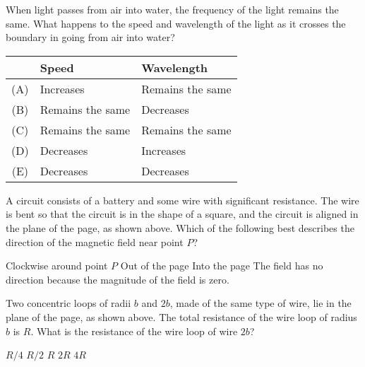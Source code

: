 \documentclass[12pt]{exam}
\begin{document}
\begin{questions}
  \question When light passes from air into water, the frequency of the light
  remains the same. What happens to the speed and wavelength of the light as
  it crosses the boundary in going from air into water?

  \begin{tabular}{cll}
    & Speed & Wavelength \\\hline
    (A) & Increases        & Remains the same \\
    (B) & Remains the same & Decreases        \\
    (C) & Remains the same & Remains the same \\
    (D) & Decreases        & Increases \\
    (E) & Decreases        & Decreases
  \end{tabular}
  
  \question A circuit consists of a battery and some wire with significant
  resistance. The wire is bent so that the circuit is in the shape of a square,
  and the circuit is aligned in the plane of the page, as shown above. Which of
  the following best describes the direction of the magnetic field near point
  $P$?
  \begin{choices}
    \choice Clockwise around point $P$
    \choice Out of the page
    \choice Into the page
    \choice The field has no direction because the magnitude of the field is
    zero.
  \end{choices}
  
  \question Two concentric loops of radii $b$ and $2b$, made of the same type of
  wire, lie in the plane of the page, as shown above. The total resistance of
  the wire loop of radius $b$ is $R$. What is the resistance of the wire loop
  of wire $2b$?
  \begin{choices}
    \choice $R/4$
    \choice $R/2$
    \choice $R$
    \choice $2R$
    \choice $4R$
  \end{choices}
  

\end{questions}
\end{document}
